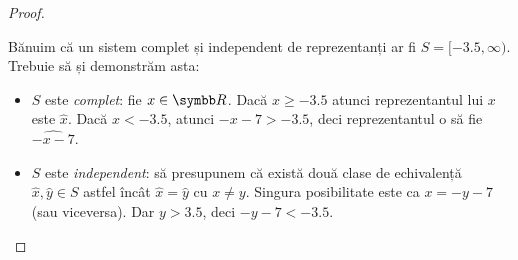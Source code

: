 \begin{proof}
\begin{enumerate}
    Bănuim că un sistem complet și independent de reprezentanți ar fi \(S = [-3.5, \infty)\). Trebuie să și demonstrăm asta:
    \begin{itemize}
        \item \(S\) este \emph{complet}: fie \(x \in \reals\). Dacă \(x \geq -3.5\) atunci reprezentantul lui \(x\) este \(\widehat{x}\). Dacă \(x < -3.5\), atunci \(-x - 7 > -3.5\), deci reprezentantul o să fie \(\widehat{-x-7}\).
        \item \(S\) este \emph{independent}: să presupunem că există două clase de echivalență \(\widehat{x}, \widehat{y} \in S\) astfel încât \(\widehat{x} = \widehat{y}\) cu \(x \neq y\). Singura posibilitate este ca \(x = -y - 7\) (sau viceversa). Dar \(y > 3.5\), deci \(-y -7 < -3.5\).
    \end{itemize}
\end{enumerate}
\end{proof}

